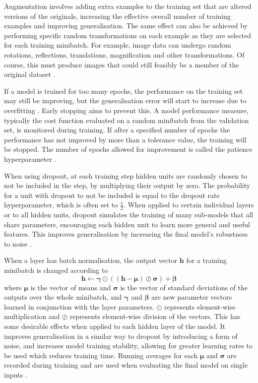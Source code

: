 \documentclass[12pt]{article}
\begin{document}
Augmentation involves adding extra examples to the training set that are altered versions of the originals, increasing the effective overall number of training examples and improving generalisation. The same effect can also be achieved by performing specific random transformations on each example as they are selected for each training minibatch. For example, image data can undergo random rotations, reflections, translations, magnification and other transformations. Of course, this must produce images that could still feasibly be a member of the original dataset \cite{Goodfellow16}.

If a model is trained for too many epochs, the performance on the training set may still be improving, but the generalisation error will start to increase due to overfitting \cite{Bishop95, Goodfellow16}. Early stopping aims to prevent this. A model performance measure, typically the cost function evaluated on a random minibatch from the validation set, is monitored during training. If after a specified number of epochs the performance has not improved by more than a tolerance value, the training will be stopped. The number of epochs allowed for improvement is called the patience hyperparameter \cite{Goodfellow16}.

When using dropout, at each training step hidden units are randomly chosen to not be included in the step, by multiplying their output by zero. The probability for a unit with dropout to not be included is equal to the dropout rate hyperparameter, which is often set to $\frac{1}{2}$. When applied to certain individual layers or to all hidden units, dropout simulates the training of many sub-models that all share parameters, encouraging each hidden unit to learn more general and useful features. This improves generalisation by increasing the final model's robustness to noise \cite{Srivastava2014}.

When a layer has batch normalisation, the output vector $\bm{h}$ for a training minibatch is changed according to
\begin{equation}
\bm{h}\leftarrow\bm{\gamma}\odot((\bm{h}-\bm{\mu})\oslash{\bm{\sigma}})+\bm{\beta}
\end{equation}
where $\bm{\mu}$ is the vector of means and $\bm{\sigma}$ is the vector of standard deviations of the outputs over the whole minibatch, and $\bm{\gamma}$ and $\bm{\beta}$ are new parameter vectors learned in conjunction with the layer parameters. $\odot$ represents element-wise multiplication and $\oslash$ represents element-wise division of the vectors. This has some desirable effects when applied to each hidden layer of the model. It improves generalisation in a similar way to dropout by introducing a form of noise, and increases model training stability, allowing for greater learning rates to be used which reduces training time. Running averages for each $\bm{\mu}$ and $\bm{\sigma}$ are recorded during training and are used when evaluating the final model on single inputs \cite{Ioffe15}.
\end{document}

